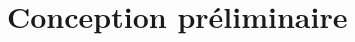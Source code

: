 \documentclass[a4paper,10pt]{report}
\begin{document}
%
%
%
%
%
%




\chapter{Conception préliminaire}

    
\end{document}
